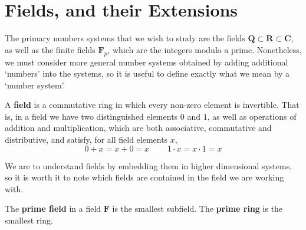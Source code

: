 \chapter{Fields, and their Extensions}

The primary numbers systems that we wish to study are the fields $\mathbf{Q} \subset \mathbf{R} \subset \mathbf{C}$, as well as the finite fields $\mathbf{F}_p$, which are the integers modulo a prime. Nonetheless, we must consider more general number systems obtained by adding additional `numbers' into the systems, so it is useful to define exactly what we mean by a `number system'.

\begin{definition}
    A {\bf field} is a commutative ring in which every non-zero element is invertible. That is, in a field we have two distinguished elements $0$ and $1$, as well as operations of addition and multiplication, which are both associative, commutative and distributive, and satisfy, for all field elements $x$,
    \[ 0 + x = x + 0 = x\ \ \ \ \ \ \ \ \ \ 1 \cdot x = x \cdot 1 = x \]
\end{definition}

We are to understand fields by embedding them in higher dimensional systems, so it is worth it to note which fields are contained in the field we are working with.

\begin{definition}
    The {\bf prime field} in a field $\mathbf{F}$ is the smallest subfield. The {\bf prime ring} is the smallest ring.
\end{definition}

